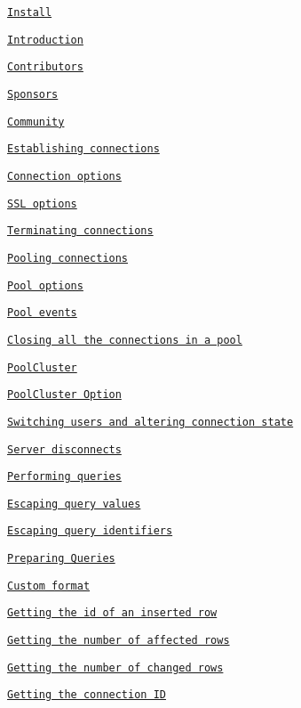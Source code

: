 \begin{DoxyItemize}
\item \href{#install}{\tt Install}
\item \href{#introduction}{\tt Introduction}
\item \href{#contributors}{\tt Contributors}
\item \href{#sponsors}{\tt Sponsors}
\item \href{#community}{\tt Community}
\item \href{#establishing-connections}{\tt Establishing connections}
\item \href{#connection-options}{\tt Connection options}
\item \href{#ssl-options}{\tt S\+S\+L options}
\item \href{#terminating-connections}{\tt Terminating connections}
\item \href{#pooling-connections}{\tt Pooling connections}
\item \href{#pool-options}{\tt Pool options}
\item \href{#pool-events}{\tt Pool events}
\item \href{#closing-all-the-connections-in-a-pool}{\tt Closing all the connections in a pool}
\item \href{#poolcluster}{\tt Pool\+Cluster}
\item \href{#poolcluster-option}{\tt Pool\+Cluster Option}
\item \href{#switching-users-and-altering-connection-state}{\tt Switching users and altering connection state}
\item \href{#server-disconnects}{\tt Server disconnects}
\item \href{#performing-queries}{\tt Performing queries}
\item \href{#escaping-query-values}{\tt Escaping query values}
\item \href{#escaping-query-identifiers}{\tt Escaping query identifiers}
\item \href{#preparing-queries}{\tt Preparing Queries}
\item \href{#custom-format}{\tt Custom format}
\item \href{#getting-the-id-of-an-inserted-row}{\tt Getting the id of an inserted row}
\item \href{#getting-the-number-of-affected-rows}{\tt Getting the number of affected rows}
\item \href{#getting-the-number-of-changed-rows}{\tt Getting the number of changed rows}
\item \href{#getting-the-connection-id}{\tt Getting the connection I\+D}

\end{DoxyItemize}

